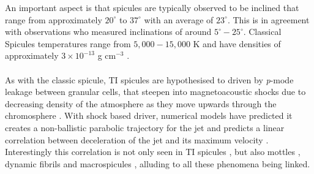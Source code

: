\documentclass[12pt]{ociamthesis}
\newcommand{\np}{\\ \\}
\begin{document}
%
An important aspect is that spicules are typically observed to be inclined that range from approximately $20^{\circ}$ \cite{Beckers1968} to $37^{\circ}$ \cite{Trujillo2005ApJ619L191T} with an average of $23^{\circ}$. This is in agreement with \cite{Pereira2012} observations who measured inclinations of around $5^{\circ}-25^{\circ}$. Classical Spicules temperatures range from $5,000-15,000$ K and have densities of approximately $3\times10^{-13}$ g cm$^{-3}$ \citep{Sterling_2000SoPh}. \np 
%
As with the classic spicule, TI spicules are hypothesised to driven by \textit{p}-mode leakage between granular cells, that steepen into magnetoacoustic shocks due to decreasing density of the atmosphere as they move upwards through the chromosphere \citep{Pontieu2004Natur, Pontieu2007PASJ, Mart2009ApJ7011569M}. With shock based driver, numerical models have predicted it creates a non-ballistic parabolic trajectory for the jet and predicts a linear correlation between deceleration of the jet and its maximum velocity \citep{Heggland2007ApJ6661277H}. Interestingly this correlation is not only seen in TI spicules \citep{Pereira2012}, but also mottles \citep{Rouppe2007ApJ660L169R}, dynamic fibrils \citep{De_Pontieu2007ApJ} and macrospicules \citep{Loboda2019ApJ871230L}, alluding to all these phenomena being linked.
\end{document}
